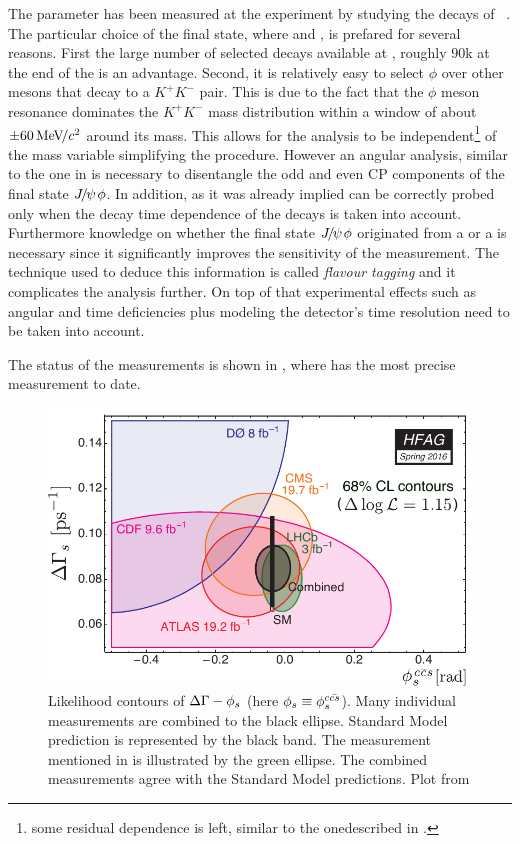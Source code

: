 The parameter \phis has been measured at the \lhcb experiment by studying the decays of \BsJpsiPhi~\cite{phis-3fb-paper}.
The particular choice of the final state, where \phiKK and \Jpsimumu, is prefared for several reasons. First the large number
of selected \BsJpsiPhi decays available at \lhcb, roughly $90$k at the end of the \runtwo is an advantage. Second, it is relatively
easy to select $\phi$ over other mesons that decay to a $K^+K^-$ pair. This is due to the fact that the $\phi$ meson resonance dominates
the $K^+K^-$ mass distribution within a window of about $\pm 60 {\mathrm{\,Me\kern -0.1em V\!/}c^2}$ around its mass. This allows for the analysis to be
independent\footnote{some residual dependence is left, similar to the onedescribed in . }
of the \mKK mass variable simplifying the procedure. However an angular analysis, similar to the one in  is necessary
to disentangle the odd and even CP components of the final state ${J\mskip -3mu/\mskip -2mu\psi\mskip 2mu}\phi$.
In addition, as it was already implied \phis can be correctly probed only when the decay time dependence of the \BsJpsiPhi decays is taken into
account. Furthermore knowledge on whether the final state ${J\mskip -3mu/\mskip -2mu\psi\mskip 2mu}\phi$ originated from a \Bs or a \Bsb is necessary since it
significantly improves the sensitivity of the \phis measurement. The technique used to deduce this information is called {\it flavour tagging}
and it complicates the analysis further. On top of that experimental effects such as angular and time deficiencies plus modeling the
\lhcb detector's time resolution need to be taken into account.

The status of the \phis measurements is shown in , where \lhcb has the most precise measurement to date.

\begin{figure}[!h]
  \centering
    \includegraphics[trim=0cm 0cm 0cm 0cm, clip=true, scale=0.8]{Figures/Chapter1/hfag_Spring2016_DGsphis_zoom.pdf}
    \caption{Likelihood contours of $\Delta\Gamma-\phi_{s}$ (here $\phi_{s}\equiv \phi_{s}^{c\bar{cs}}$). Many individual measurements are
             combined to the black ellipse. Standard Model prediction is represented by the black band. The \lhcb measurement
             mentioned in  is illustrated by the green ellipse. The combined measurements agree with the Standard Model
             predictions. Plot from \cite{hfag-2014} }
    \label{hfag_phis_dg}
\end{figure}

